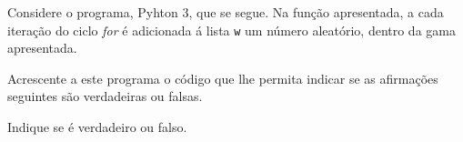 \documentclass[12pt,varwidth=16cm,border=1pt]{standalone}
\begin{document}
Considere o programa, Pyhton 3, que se segue. Na função apresentada, a cada iteração do ciclo \textit{for} é adicionada á lista \verb+w+ um número aleatório, dentro da gama apresentada.



Acrescente a este programa o código que lhe permita indicar se as afirmações seguintes são verdadeiras ou falsas.

Indique se é verdadeiro ou falso.
\end{document}
